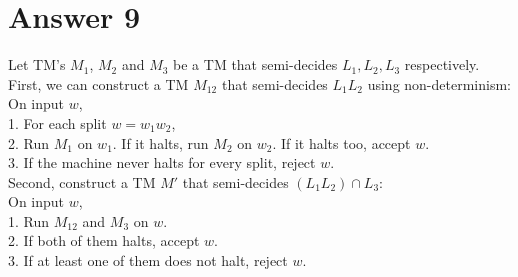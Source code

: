 \documentclass[12pt]{article}
\begin{document}
\section*{Answer 9}
Let TM's $M_1$, $M_2$ and $M_3$ be a TM that semi-decides $L_1, L_2,L_3$ respectively.\\
First, we can construct a TM $M_{12}$ that semi-decides $L_1L_2$ using non-determinism:\\
On input $w$, \\
1. For each split $w=w_1w_2$,\\
2. Run $M_1$ on $w_1$. If it halts, run $M_2$ on $w_2$. If it halts too, accept $w$.\\
3. If the machine never halts for every split, reject $w$.\\
Second, construct a TM $M'$ that semi-decides $(L_1L_2)\cap L_3$:\\
On input $w$, \\
1. Run $M_{12}$ and $M_3$ on $w$.\\
2. If both of them halts, accept $w$.\\
3. If at least one of them does not halt, reject $w$.

\end{document}
